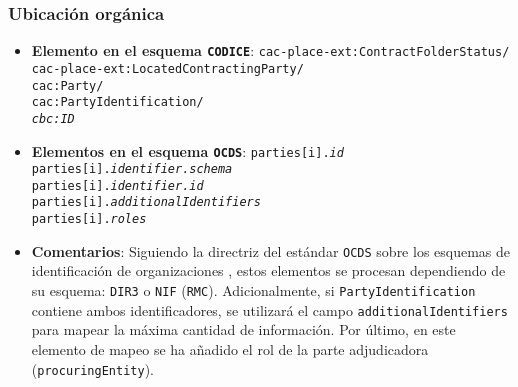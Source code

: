         \subsubsection{Ubicación orgánica} \label{subsec:UbicacionOrganica}
            \begin{itemize}
                \item \textbf{Elemento en el esquema \texttt{CODICE}}:
                    \tabto{7.6cm} \texttt{cac-place-ext:ContractFolderStatus/} \\
                    \tabto{7.6cm} \texttt{cac-place-ext:LocatedContractingParty/} \\
                    \tabto{7.6cm} \texttt{cac:Party/} \\
                    \tabto{7.6cm} \texttt{cac:PartyIdentification/} \\
                    \tabto{7.6cm} \texttt{\textit{cbc:ID}}
                \item \textbf{Elementos en el esquema \texttt{OCDS}}:
                    \tabto{7.6cm} \texttt{parties[i].\textit{id}} \\
                    \tabto{7.6cm} \texttt{parties[i].\textit{identifier.schema}} \\
                    \tabto{7.6cm} \texttt{parties[i].\textit{identifier.id}} \\
                    \tabto{7.6cm} \texttt{parties[i].\textit{additionalIdentifiers}} \\
                    \tabto{7.6cm} \texttt{parties[i].\textit{roles}}
                \item \textbf{Comentarios}: Siguiendo la directriz del estándar \texttt{OCDS} sobre los esquemas de identificación de organizaciones \cite{CR13}, estos elementos se procesan dependiendo de su esquema: \texttt{DIR3} \cite{CR14} o \texttt{NIF} \cite{CR15} (\texttt{RMC}). Adicionalmente, si \texttt{PartyIdentification} contiene ambos identificadores, se utilizará el campo \texttt{additionalIdentifiers} para mapear la máxima cantidad de información. Por último, en este elemento de mapeo se ha añadido el rol de la parte adjudicadora (\texttt{procuringEntity}).
            \end{itemize}
        
